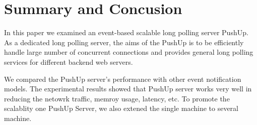 \section{Summary and Concusion\\}

In this paper we examined an event-based scalable long polling server PushUp.
As a dedicated long polling server, the aims of the PushUp is to be efficiently
handle large number of concurrent connections and provides general long 
polling services for different backend web servers.

We compared the PushUp server's performance with other event notification 
models.  The experimental results showed that PushUp server works very 
well in reducing the netowrk traffic, memroy usage, latency, etc. To 
promote the scalablity one PushUp Server, we also extened the single 
machine to several machine.

